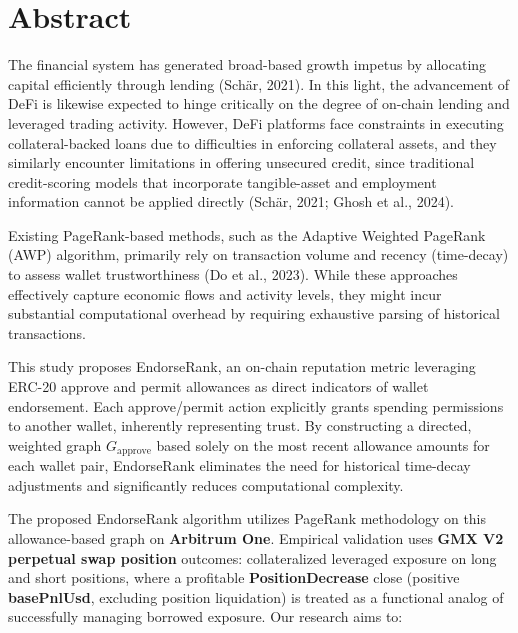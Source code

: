 \section*{Abstract}
\label{sec:abstract}

The financial system has generated broad-based growth impetus by allocating capital efficiently through lending (Sch\"{a}r, 2021). In this light, the advancement of DeFi is likewise expected to hinge critically on the degree of on-chain lending and leveraged trading activity. However, DeFi platforms face constraints in executing collateral-backed loans due to difficulties in enforcing collateral assets, and they similarly encounter limitations in offering unsecured credit, since traditional credit-scoring models that incorporate tangible-asset and employment information cannot be applied directly (Sch\"{a}r, 2021; Ghosh et al., 2024).


Existing PageRank-based methods, such as the Adaptive Weighted PageRank (AWP) algorithm, primarily rely on transaction volume and recency (time-decay) to assess wallet trustworthiness (Do et al., 2023). While these approaches effectively capture economic flows and activity levels, they might incur substantial computational overhead by requiring exhaustive parsing of historical transactions.


This study proposes EndorseRank, an on-chain reputation metric leveraging ERC-20 approve and permit allowances as direct indicators of wallet endorsement. Each approve/permit action explicitly grants spending permissions to another wallet, inherently representing trust. By constructing a directed, weighted graph $G_{\text{approve}}$ based solely on the most recent allowance amounts for each wallet pair, EndorseRank eliminates the need for historical time-decay adjustments and significantly reduces computational complexity.


The proposed EndorseRank algorithm utilizes PageRank methodology on this allowance-based graph on \textbf{Arbitrum One}. Empirical validation uses \textbf{GMX V2 perpetual swap position} outcomes: collateralized leveraged exposure on long and short positions, where a profitable \textbf{PositionDecrease} close (positive \textbf{basePnlUsd}, excluding position liquidation) is treated as a functional analog of successfully managing borrowed exposure. Our research aims to:


